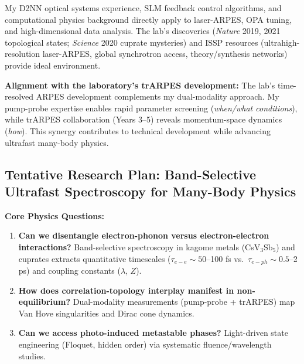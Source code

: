 \documentclass[11pt,a4paper]{article}
\begin{document}
My D2NN optical systems experience, SLM feedback control algorithms, and computational physics background directly apply to laser-ARPES, OPA tuning, and high-dimensional data analysis. The lab's discoveries (\textit{Nature} 2019, 2021 topological states; \textit{Science} 2020 cuprate mysteries) and ISSP resources (ultrahigh-resolution laser-ARPES, global synchrotron access, theory/synthesis networks) provide ideal environment.

\textbf{Alignment with the laboratory's trARPES development:} The lab's time-resolved ARPES development complements my dual-modality approach. My pump-probe expertise enables rapid parameter screening (\textit{when/what conditions}), while trARPES collaboration (Years 3--5) reveals momentum-space dynamics (\textit{how}). This synergy contributes to technical development while advancing ultrafast many-body physics.

\subsection{Tentative Research Plan: Band-Selective Ultrafast Spectroscopy for Many-Body Physics}

\textbf{Core Physics Questions:}
\begin{enumerate}
    \item \textbf{Can we disentangle electron-phonon versus electron-electron interactions?} Band-selective spectroscopy in kagome metals (CsV$_3$Sb$_5$) and cuprates extracts quantitative timescales ($\tau_{e-e} \sim 50$--100 fs vs.~$\tau_{e-ph} \sim 0.5$--2 ps) and coupling constants ($\lambda$, $Z$).
    \item \textbf{How does correlation-topology interplay manifest in non-equilibrium?} Dual-modality measurements (pump-probe + trARPES) map Van Hove singularities and Dirac cone dynamics.
    \item \textbf{Can we access photo-induced metastable phases?} Light-driven state engineering (Floquet, hidden order) via systematic fluence/wavelength studies.
\end{enumerate}
\end{document}
